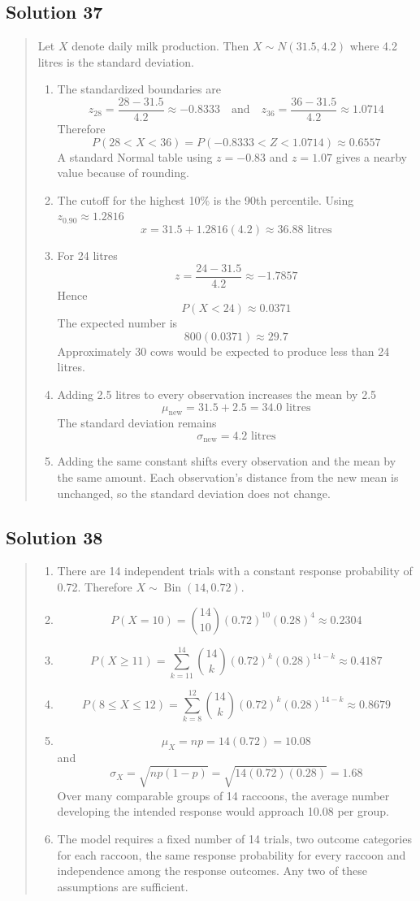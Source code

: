 \documentclass[10pt,letterpaper]{article}
\newcommand{\solutionheading}[1]{%
  \subsection*{Solution #1}
}
\newenvironment{answer}{%
  \begin{quote}\small\color{black}
}{%
  \end{quote}
}
\begin{document}
\solutionheading{37}
\begin{answer}
Let $X$ denote daily milk production. Then $X\sim N(31.5,4.2)$ where 4.2 litres is the standard deviation.
\begin{enumerate}
	\item The standardized boundaries are
	$$z_{28}=\frac{28-31.5}{4.2}\approx-0.8333 \quad \text{and} \quad z_{36}=\frac{36-31.5}{4.2}\approx1.0714$$
	Therefore
	$$P(28<X<36)=P(-0.8333<Z<1.0714)\approx0.6557$$
  	A standard Normal table using $z=-0.83$ and $z=1.07$ gives a nearby value because of rounding.
  	\item The cutoff for the highest 10\% is the 90th percentile. Using $z_{0.90}\approx1.2816$
	$$x=31.5+1.2816(4.2)\approx36.88\text{ litres}$$
	\item For 24 litres
	$$z=\frac{24-31.5}{4.2}\approx-1.7857$$
  	Hence
	$$P(X<24)\approx0.0371$$
  	The expected number is
	$$800(0.0371)\approx29.7$$
  	Approximately 30 cows would be expected to produce less than 24 litres.
  	\item Adding 2.5 litres to every observation increases the mean by 2.5
	$$\mu_{\text{new}}=31.5+2.5=34.0\text{ litres}$$
  	The standard deviation remains
	$$ \sigma_{\text{new}}=4.2\text{ litres}$$
	\item Adding the same constant shifts every observation and the mean by the same amount. Each observation's distance from the new mean is unchanged, so the standard deviation does not change.
\end{enumerate}
\end{answer}

\solutionheading{38}
\begin{answer}
\begin{enumerate}
	\item There are 14 independent trials with a constant response probability of 0.72. Therefore $X\sim\operatorname{Bin}(14,0.72)$.
  	\item
	$$P(X=10)=\binom{14}{10}(0.72)^{10}(0.28)^4\approx0.2304$$
	\item
	$$P(X\geq11)=\sum_{k=11}^{14}\binom{14}{k}(0.72)^k(0.28)^{14-k}\approx0.4187$$
	\item
	$$P(8\leq X\leq12)=\sum_{k=8}^{12}\binom{14}{k}(0.72)^k(0.28)^{14-k}\approx0.8679$$
  	\item
	$$\mu_X=np=14(0.72)=10.08$$
  	and
	$$\sigma_X=\sqrt{np(1-p)}=\sqrt{14(0.72)(0.28)}=1.68$$
  	Over many comparable groups of 14 raccoons, the average number developing the intended response would approach 10.08 per group.
	\item The model requires a fixed number of 14 trials, two outcome categories for each raccoon, the same response probability for every raccoon and independence among the response outcomes. Any two of these assumptions are sufficient.
\end{enumerate}
\end{answer}
\end{document}
